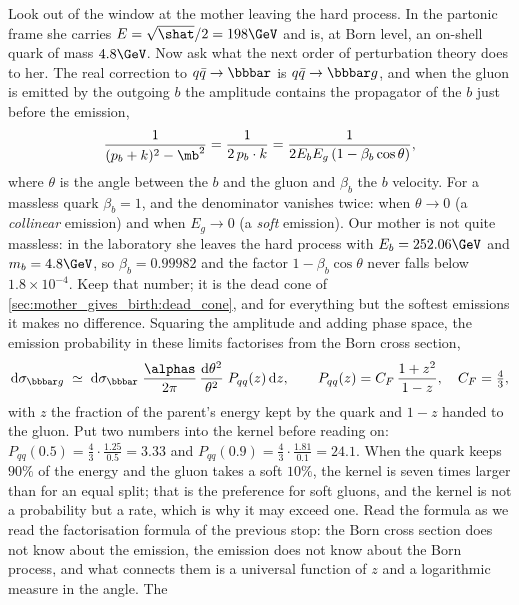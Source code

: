 Look out of the window at the mother leaving the hard process. In the
partonic frame she carries $E=\sqrt{\shat}/2=198\GeV$ and is, at Born level,
an on-shell quark of mass $4.8\GeV$. Now ask what the next order of
perturbation theory does to her. The real correction to $q\bar q\to\bbbar$
is $q\bar q\to\bbbar g$, and when the gluon is emitted by the outgoing $b$
the amplitude contains the propagator of the $b$ just before the emission,
\begin{equation}
  \frac{1}{(p_b+k)^2-\mb^2}=\frac{1}{2\,p_b\cdot k}
  =\frac{1}{2E_bE_g\,(1-\beta_b\cos\theta)},
  \label{eq:mother_gives_birth:propagator}
\end{equation}
where $\theta$ is the angle between the $b$ and the gluon and
$\beta_b$ the $b$ velocity. For a massless quark $\beta_b=1$, and the
denominator vanishes twice: when $\theta\to0$ (a \emph{collinear} emission)
and when $E_g\to0$ (a \emph{soft} emission). Our mother is not quite
massless: in the laboratory she leaves the hard process with
$E_b=252.06\GeV$ and $m_b=4.8\GeV$, so $\beta_b=0.99982$ and the factor
$1-\beta_b\cos\theta$ never falls below $1.8\times10^{-4}$. Keep that
number; it is the dead cone of \cref{sec:mother_gives_birth:dead_cone}, and
for everything but the softest emissions it makes no difference. Squaring the amplitude and
adding phase space, the emission probability in these limits factorises
from the Born cross section,
\begin{equation}
  \mathrm{d}\sigma_{\bbbar g}\;\simeq\;\mathrm{d}\sigma_{\bbbar}\;
  \frac{\alphas}{2\pi}\,\frac{\mathrm{d}\theta^2}{\theta^2}\;
  P_{qq}(z)\,\mathrm{d}z,
  \qquad
  P_{qq}(z)=C_F\,\frac{1+z^2}{1-z},\quad C_F=\tfrac43 ,
  \label{eq:mother_gives_birth:collinear_limit}
\end{equation}
with $z$ the fraction of the parent's energy kept by the quark and $1-z$
handed to the gluon. Put two numbers into the kernel before reading on:
$P_{qq}(0.5)=\tfrac43\cdot\tfrac{1.25}{0.5}=3.33$ and
$P_{qq}(0.9)=\tfrac43\cdot\tfrac{1.81}{0.1}=24.1$. When the quark keeps
$90\%$ of the energy and the gluon takes a soft $10\%$, the kernel is seven
times larger than for an equal split; that is the preference for soft
gluons, and the kernel is not a probability but a rate, which is why it may
exceed one. Read the formula as we read the factorisation formula of the
previous stop: the Born cross section does not know about the emission, the
emission does not know about the Born process, and what connects them is a
universal function of $z$ and a logarithmic measure in the angle. The
